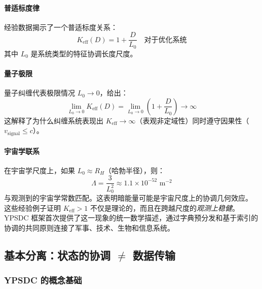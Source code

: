 \documentclass[11pt,a4paper]{article}
\begin{document}
	\paragraph{普适标度律}
	经验数据揭示了一个普适标度关系：
	\begin{equation}
		\boxed{K_{\mathrm{eff}}(D) = 1 + \frac{D}{L_0} \quad \text{对于优化系统}}
	\end{equation}
	其中 $L_0$ 是系统类型的特征协调长度尺度。
	
	\paragraph{量子极限}
	量子纠缠代表极限情况 $L_0 \to 0$，给出：
	\begin{equation}
		\lim_{L_0 \to 0} K_{\mathrm{eff}}(D) = \lim_{L_0 \to 0} \left(1 + \frac{D}{L_0}\right) \to \infty
	\end{equation}
	这解释了为什么纠缠系统表现出 $K_{\mathrm{eff}} \to \infty$（表观非定域性）同时遵守因果性（$v_{\text{signal}} \leq c$）。
	
	\paragraph{宇宙学联系}
	在宇宙学尺度上，如果 $L_0 \approx R_H$（哈勃半径），则：
	\begin{equation}
		\Lambda = \frac{3}{L_0^2} \approx 1.1 \times 10^{-52} \text{ m}^{-2}
	\end{equation}
	与观测到的宇宙学常数匹配。这表明暗能量可能是宇宙尺度上的协调几何效应。
	这些经验例子证明 $K_{\mathrm{eff}} > 1$ 不仅是理论的，而且在跨越尺度的\textit{观测上稳健}。YPSDC 框架首次提供了这一现象的统一数学描述，通过字典预分发和基于索引的协调的共同原则连接了军事、技术、生物和信息系统。
	
	
	\subsection{基本分离：状态的协调 $\neq$ 数据传输}
	\label{subsec:coordination-vs-data}
	
	\subsubsection{YPSDC 的概念基础}
	
\end{document}

